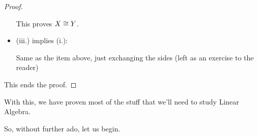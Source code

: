 \begin{proof}
\begin{itemize}
		This proves $X\cong Y$.
		
		\item (iii.) implies (i.):
		
		Same as the item above, just exchanging the sides (left as an exercise to the reader)
	\end{itemize}

This ends the proof.
\end{proof}

With this, we have proven most of the stuff that we'll need to study Linear Algebra.

So, without further ado, let us begin.